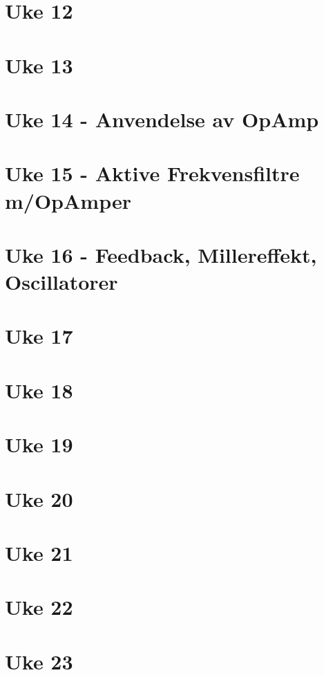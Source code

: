 \documentclass{article}
\begin{document}
  \section{Uke 12}
    
  \section{Uke 13}
    
  \section{Uke 14 - Anvendelse av OpAmp}
    
  \section{Uke 15 - Aktive Frekvensfiltre m/OpAmper}
    
  \section{Uke 16 - Feedback, Millereffekt, Oscillatorer}
    
  \section{Uke 17}
  \section{Uke 18}
  \section{Uke 19}
  \section{Uke 20}
  \section{Uke 21}
  \section{Uke 22}
  \section{Uke 23}
\end{document}
